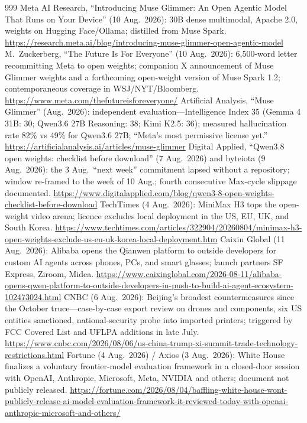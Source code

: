 \begin{thebibliography}{999}
 Meta AI Research, ``Introducing Muse Glimmer: An Open Agentic Model That Runs on Your Device'' (10 Aug.\ 2026): 30B dense multimodal, Apache 2.0, weights on Hugging Face/Ollama; distilled from Muse Spark. \url{https://research.meta.ai/blog/introducing-muse-glimmer-open-agentic-model}
 M.~Zuckerberg, ``The Future Is For Everyone'' (10 Aug.\ 2026): 6,500-word letter recommitting Meta to open weights; companion X announcement of Muse Glimmer weights and a forthcoming open-weight version of Muse Spark 1.2; contemporaneous coverage in WSJ/NYT/Bloomberg. \url{https://www.meta.com/thefutureisforeveryone/}
 Artificial Analysis, ``Muse Glimmer'' (Aug.\ 2026): independent evaluation---Intelligence Index 35 (Gemma 4 31B: 30; Qwen3.6 27B Reasoning: 38; Kimi K2.5: 36); measured hallucination rate 82\% vs 49\% for Qwen3.6 27B; ``Meta's most permissive license yet.'' \url{https://artificialanalysis.ai/articles/muse-glimmer}
 Digital Applied, ``Qwen3.8 open weights: checklist before download'' (7 Aug.\ 2026) and byteiota (9 Aug.\ 2026): the 3 Aug.\ ``next week'' commitment lapsed without a repository; window re-framed to the week of 10 Aug.; fourth consecutive Max-cycle slippage documented. \url{https://www.digitalapplied.com/blog/qwen3-8-open-weights-checklist-before-download}
 TechTimes (4 Aug.\ 2026): MiniMax H3 tops the open-weight video arena; licence excludes local deployment in the US, EU, UK, and South Korea. \url{https://www.techtimes.com/articles/322904/20260804/minimax-h3-open-weights-exclude-us-eu-uk-korea-local-deployment.htm}
 Caixin Global (11 Aug.\ 2026): Alibaba opens the Qianwen platform to outside developers for custom AI agents across phones, PCs, and smart glasses; launch partners SF Express, Ziroom, Midea. \url{https://www.caixinglobal.com/2026-08-11/alibaba-opens-qwen-platform-to-outside-developers-in-push-to-build-ai-agent-ecosystem-102473024.html}
 CNBC (6 Aug.\ 2026): Beijing's broadest countermeasures since the October truce---case-by-case export review on drones and components, six US entities sanctioned, national-security probe into imported printers; triggered by FCC Covered List and UFLPA additions in late July. \url{https://www.cnbc.com/2026/08/06/us-china-trump-xi-summit-trade-technology-restrictions.html}
 Fortune (4 Aug.\ 2026) / Axios (3 Aug.\ 2026): White House finalizes a voluntary frontier-model evaluation framework in a closed-door session with OpenAI, Anthropic, Microsoft, Meta, NVIDIA and others; document not publicly released. \url{https://fortune.com/2026/08/04/baffling-white-house-wont-publicly-release-ai-model-evaluation-framework-it-reviewed-today-with-openai-anthropic-microsoft-and-others/}

\end{thebibliography}
